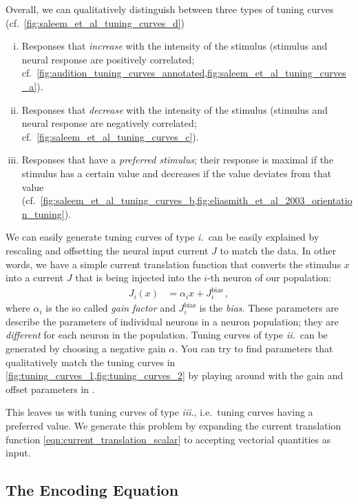 \documentclass[10pt,letterpaper,oneside]{article}
\begin{document}
Overall, we can qualitatively distinguish between three types of tuning curves (cf.~\cref{fig:saleem_et_al_tuning_curves_d})
\begin{enumerate}[i.]
	\item Responses that \emph{increase} with the intensity of the stimulus (stimulus and neural response are positively correlated; cf.~\cref{fig:audition_tuning_curves_annotated,fig:saleem_et_al_tuning_curves_a}).
	\item Responses that \emph{decrease} with the intensity of the stimulus (stimulus and neural response are negatively correlated; cf.~\cref{fig:saleem_et_al_tuning_curves_c}).
	\item Responses that have a \emph{preferred stimulus}; their response is maximal if the stimulus has a certain value and decreases if the value deviates from that value (cf.~\cref{fig:saleem_et_al_tuning_curves_b,fig:eliasmith_et_al_2003_orientation_tuning}).
\end{enumerate}

We can easily generate tuning curves of type \emph{i.}~can be easily explained by rescaling and offsetting the neural input current $J$ to match the data. In other words, we have a simple current translation function that converts the stimulus $x$ into a current $J$ that is being injected into the $i$-th neuron of our population:
\begin{align}
	J_i(x) &= \alpha_i x + J^\mathrm{bias}_i \,,
	\label{eqn:current_translation_scalar}
\end{align}
where $\alpha_i$ is the so called \emph{gain factor} and $J^\mathrm{bias}_i$ is the \emph{bias}. These parameters are describe the parameters of individual neurons in a neuron population; they are \emph{different} for each neuron in the population. Tuning curves of type \emph{ii.}~can be generated by choosing a negative gain $\alpha$. You can try to find parameters that qualitatively match the tuning curves in \cref{fig:tuning_curves_1,fig:tuning_curves_2} by playing around with the gain and offset parameters in .

This leaves us with tuning curves of type \emph{iii.}, i.e.~tuning curves having a preferred value. We generate this problem by expanding the current translation function \cref{eqn:current_translation_scalar} to accepting vectorial quantities as input.

\subsection{The Encoding Equation}
\end{document}
